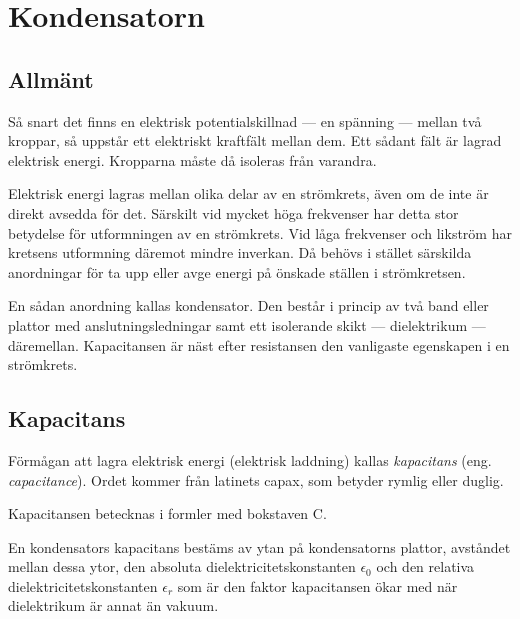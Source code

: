 \section{Kondensatorn}

\subsection{Allmänt}

Så snart det finns en elektrisk potentialskillnad --- en spänning --- mellan två
kroppar, så uppstår ett elektriskt kraftfält mellan dem. Ett sådant fält är
lagrad elektrisk energi. Kropparna måste då isoleras från varandra.

Elektrisk energi lagras mellan olika delar av en strömkrets, även om de inte är
direkt avsedda för det. Särskilt vid mycket höga frekvenser har detta stor
betydelse för utformningen av en strömkrets. Vid låga frekvenser och likström
har kretsens utformning däremot mindre inverkan. Då behövs i stället särskilda
anordningar för ta upp eller avge energi på önskade ställen i strömkretsen.

En sådan anordning kallas kondensator. Den består i princip av två band eller
plattor med anslutningsledningar samt ett isolerande skikt --- dielektrikum ---
däremellan. Kapacitansen är näst efter resistansen den vanligaste egenskapen i
en strömkrets.

\subsection{Kapacitans}

Förmågan att lagra elektrisk energi (elektrisk laddning) kallas
\emph{kapacitans} (eng. \emph{capacitance}).
Ordet kommer från latinets capax, som betyder rymlig eller duglig.

Kapacitansen betecknas i formler med bokstaven C.

En kondensators kapacitans bestäms av ytan på kondensatorns plattor, avståndet
mellan dessa ytor, den absoluta dielektricitetskonstanten \(\epsilon_0\) och den
relativa dielektricitetskonstanten \(\epsilon_r\) som är den faktor kapacitansen
ökar med när dielektrikum är annat än vakuum.

